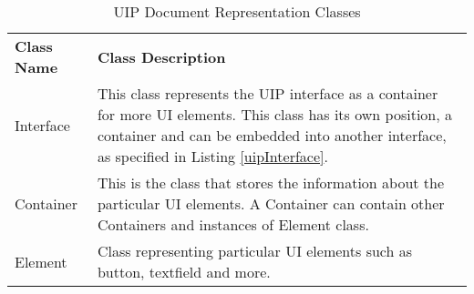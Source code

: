 \begin{table}[htbp]
  \centering
  \caption{UIP Document Representation Classes}
  \label{tab:uipDocClasses}
 \renewcommand{\arraystretch}{1.2}
    \begin{tabularx}{\textwidth}{p{2.5cm}|X}
    \rowcolor{mygray}
    \textbf{Class Name} & \textbf{Class Description} \\
       Interface & This class represents the UIP interface as a container for more UI elements. This class has its own position, a container and can be embedded into another interface, as specified in Listing \ref{uipInterface}. \\ \hline
       Container & This is the class that stores the information about the particular UI elements. A Container can contain other Containers and instances of Element class.\\ \hline
       Element & Class representing particular UI elements such as button, textfield and more. \\
    \end{tabularx}%
    \label{tab:uipDocClasses2}
\end{table}%